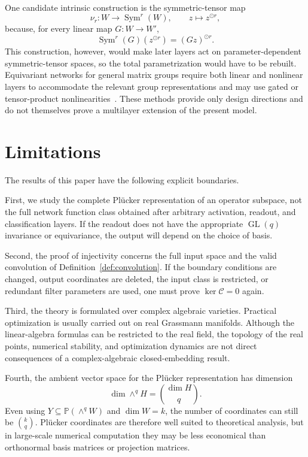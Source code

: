 \documentclass{siamonline250211}
\newcommand{\PP}{\mathbb P}
\newcommand{\GL}{\operatorname{GL}}
\newcommand{\Sym}{\operatorname{Sym}}
\newcommand{\cC}{\mathcal C}
\begin{document}
One candidate intrinsic construction is the symmetric-tensor map
\[
  \nu_r:W\longrightarrow\Sym^r(W),
  \qquad z\longmapsto z^{\odot r},
\]
because, for every linear map $G:W\to W'$,
\[
  \Sym^r(G)(z^{\odot r})=(Gz)^{\odot r}.
\]
This construction, however, would make later layers act on parameter-dependent
symmetric-tensor spaces, so the total parametrization would have to be rebuilt.
Equivariant networks for general matrix groups require both linear and nonlinear
layers to accommodate the relevant group representations and may use gated or
tensor-product nonlinearities~\cite{FWW21}. These methods provide only design
directions and do not themselves prove a multilayer extension of the present
model.

\section{Limitations}

The results of this paper have the following explicit boundaries.

First, we study the complete Pl\"ucker representation of an operator subspace,
not the full network function class obtained after arbitrary activation,
readout, and classification layers. If the readout does not have the appropriate
$\GL(q)$ invariance or equivariance, the output will depend on the choice of
basis.

Second, the proof of injectivity concerns the full input space and the valid
convolution of Definition~\ref{def:convolution}. If the boundary conditions are
changed, output coordinates are deleted, the input class is restricted, or
redundant filter parameters are used, one must prove $\ker\cC=0$ again.

Third, the theory is formulated over complex algebraic varieties. Practical
optimization is usually carried out on real Grassmann manifolds. Although the
linear-algebra formulas can be restricted to the real field, the topology of the
real points, numerical stability, and optimization dynamics are not direct
consequences of a complex-algebraic closed-embedding result.

Fourth, the ambient vector space for the Pl\"ucker representation has dimension
\[
  \dim\wedge^qH=\binom{\dim H}{q}.
\]
Even using $Y\subseteq\PP(\wedge^qW)$ and $\dim W=k$, the number of coordinates
can still be $\binom{k}{q}$. Pl\"ucker coordinates are therefore well suited to
theoretical analysis, but in large-scale numerical computation they may be less
economical than orthonormal basis matrices or projection matrices.
\end{document}
